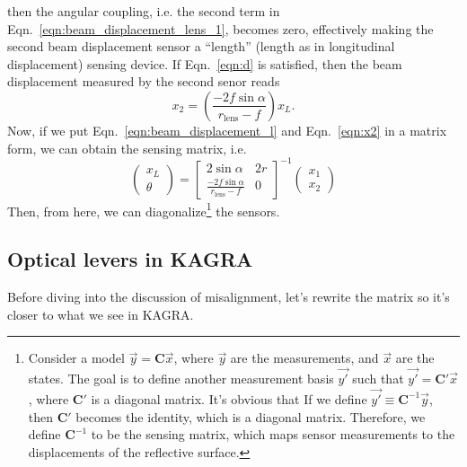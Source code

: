 then the angular coupling, i.e. the second term in Eqn.~\eqref{eqn:beam_displacement_lens_1}, becomes zero, effectively making the second beam displacement sensor a ``length'' (length as in longitudinal displacement) sensing device.
If Eqn.~\eqref{eqn:d} is satisfied, then the beam displacement measured by the second senor reads
\begin{equation}
	x_2 = \left(\frac{-2f\sin\alpha}{r_\mathrm{lens}-f}\right)x_L.
	\label{eqn:x2}
\end{equation}
Now, if we put Eqn.~\eqref{eqn:beam_displacement_l} and Eqn.~\eqref{eqn:x2} in a matrix form, we can obtain the sensing matrix, i.e.
\begin{equation}
	\begin{pmatrix}
		x_L\\
		\theta
	\end{pmatrix}
	=
	\begin{bmatrix}
		2\sin\alpha & 2r\\
		\frac{-2f\sin\alpha}{r_\mathrm{lens}-f} & 0
	\end{bmatrix}^{-1}
	\begin{pmatrix}
		x_1\\
		x_2
	\end{pmatrix}
\end{equation}
Then, from here, we can diagonalize\footnote{
Consider a model $\vec{y}=\mathbf{C}\vec{x}$, where $\vec{y}$ are the measurements, and $\vec{x}$ are the states.
The goal is to define another measurement basis $\vec{y'}$ such that $\vec{y'}=\mathbf{C'}\vec{x}$, where $\mathbf{C'}$ is a diagonal matrix.
It's obvious that If we define $\vec{y'}\equiv\mathbf{C}^{-1}\vec{y}$, then $\mathbf{C'}$ becomes the identity, which is a diagonal matrix.
Therefore, we define $\mathbf{C}^\mathrm{-1}$ to be the sensing matrix, which maps sensor measurements to the displacements of the reflective surface.
}
the sensors.

\subsection{Optical levers in KAGRA \label{sec:optical_levers_in_kagra}}
Before diving into the discussion of misalignment, let's rewrite the matrix so it's closer to what we see in KAGRA.

